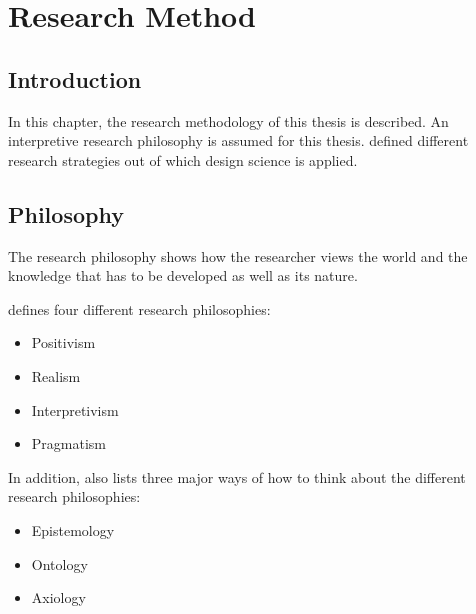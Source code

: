 
\chapter{Research Method} %

\label{Research Method} %


\section{Introduction}

In this chapter, the research methodology of this thesis is described. An interpretive research philosophy is assumed for this thesis. \cite{Hevner2010} defined different research strategies out of which design science is applied.



\section{Philosophy}

The research philosophy shows how the researcher views the world and the knowledge that has to be developed as well as its nature.

\cite{Saunders2009} defines four different research philosophies:
\begin{itemize}[noitemsep,nolistsep]
	\item Positivism
	\item Realism
	\item Interpretivism
	\item Pragmatism
\end{itemize}

In addition, \cite{Saunders2009} also lists three major ways of how to think about the different research philosophies:
\begin{itemize}[noitemsep,nolistsep]
	\item Epistemology
	\item Ontology
	\item Axiology
\end{itemize}

